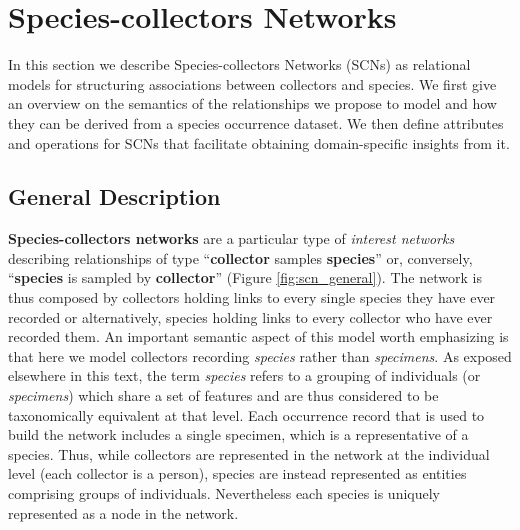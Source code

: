 {%

\section{Species-collectors Networks}

In this section we describe Species-collectors Networks (SCNs) as relational models for structuring associations between collectors and species.
We first give an overview on the semantics of the relationships we propose to model and how they can be derived from a species occurrence dataset.
We then define attributes and operations for SCNs that facilitate obtaining domain-specific insights from it.

\subsection{General Description}
\textbf{Species-collectors networks} are a particular type of \textit{interest networks} describing relationships of type ``\textbf{collector} samples \textbf{species}'' or, conversely, ``\textbf{species} is sampled by \textbf{collector}'' (Figure \ref{fig:scn_general}). 
The network is thus composed by collectors holding links to every single species they have ever recorded or alternatively, species holding links to every collector who have ever recorded them.
An important semantic aspect of this model worth emphasizing is that here we model collectors recording \textit{species} rather than \textit{specimens}. 
As exposed elsewhere in this text, the term \textit{species} refers to a grouping of individuals (or \textit{specimens}) which share a set of features and are thus considered to be taxonomically equivalent at that level. %
Each occurrence record that is used to build the network includes a single specimen, which is a representative of a species.
Thus, while collectors are represented in the network at the individual level (each collector is a person), species are instead represented as entities comprising groups of individuals.
Nevertheless each species is uniquely represented as a node in the network.

}
